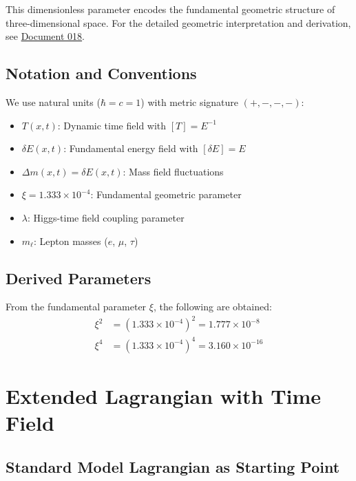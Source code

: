 	This dimensionless parameter encodes the fundamental geometric structure of three-dimensional space. For the detailed geometric interpretation and derivation, see \href{https://github.com/jpascher/T0-Time-Mass-Duality/blob/main/2/pdf/018_T0_Anomale-g2-10_De.pdf}{Document 018}.
	
	\subsection{Notation and Conventions}
	
	We use natural units ($\hbar = c = 1$) with metric signature $(+,-,-,-)$:
	
	\begin{itemize}
		\item $T(x,t)$: Dynamic time field with $[T] = E^{-1}$
		\item $\delta E(x,t)$: Fundamental energy field with $[\delta E] = E$
		\item $\Delta m(x,t) = \delta E(x,t)$: Mass field fluctuations
		\item $\xi = 1.333 \times 10^{-4}$: Fundamental geometric parameter
		\item $\lambda$: Higgs-time field coupling parameter
		\item $m_\ell$: Lepton masses ($e$, $\mu$, $\tau$)
	\end{itemize}
	
	\subsection{Derived Parameters}
	
	From the fundamental parameter $\xi$, the following are obtained:
	\begin{align}
		\xi^2 &= \left(1.333 \times 10^{-4}\right)^2 = 1.777 \times 10^{-8} \label{eq:xi_squared} \\
		\xi^4 &= \left(1.333 \times 10^{-4}\right)^4 = 3.160 \times 10^{-16} \label{eq:xi_fourth}
	\end{align}
	
	\section{Extended Lagrangian with Time Field}
	
	\subsection{Standard Model Lagrangian as Starting Point}
	
